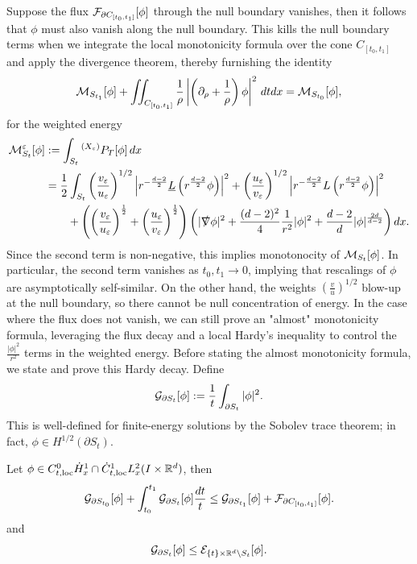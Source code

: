 Suppose the flux $\mathcal F_{\partial C_{[t_0, t_1]}}[\phi]$ through the null boundary vanishes, then it follows that $\phi$ must also vanish along the null boundary. This kills the null boundary terms when we integrate the local monotonicity formula over the cone $C_{[t_0, t_1]}$ and apply the divergence theorem, thereby furnishing the identity
	\[
			\mathcal M_{S_{t_1}} [\phi] + \iint_{C_{[t_0, t_1]}} \frac1\rho \left| \left( \partial_\rho + \frac1\rho \right) \phi\right|^2 \, dt dx = \mathcal M_{S_{t_0}} [\phi],
	\]
for the weighted energy
	\begin{align*}
		\mathcal M^\varepsilon_{S_t} [\phi] 
			&:= \int_{S_t} {^{(X_\varepsilon)}}P_T [\phi] \, dx \\
			&= \frac12 \int_{S_t} \left( \frac{v_\varepsilon}{u_\varepsilon} \right)^{1/2} \left| r^{-\frac{d - 2}{2}} \underline L \left( r^{\frac{d - 2}{2}} \phi \right)\right|^2 + \left( \frac{u_\varepsilon}{v_\varepsilon} \right)^{1/2} \left| r^{-\frac{d - 2}{2}} L \left( r^{\frac{d - 2}{2}} \phi \right)\right|^2 \\
			&\qquad + \left( \left( \frac{v_\varepsilon}{u_\varepsilon}\right)^\frac12  + \left( \frac{u_\varepsilon}{v_\varepsilon} \right)^\frac12 \right) \left(  |\slashed \nabla \phi|^2 + \frac{(d - 2)^2}{4} \frac1{r^2} |\phi|^2 + \frac{d - 2}{d} |\phi|^{\frac{2d}{d - 2}}  \right)	dx.
	\end{align*}
Since the second term is non-negative, this implies monotonocity of $\mathcal M_{S_{t}}[\phi]$. In particular, the second term vanishes as $t_0, t_1 \to 0$, implying that rescalings of $\phi$ are asymptotically self-similar. On the other hand, the weights $(\tfrac{v}{u})^{1/2}$ blow-up at the null boundary, so there cannot be null concentration of energy. In the case where the flux does not vanish, we can still prove an "almost" monotonicity formula, leveraging the flux decay and a local Hardy's inequality to control the $\tfrac{|\phi|^2}{r^2}$ terms in the weighted energy. Before stating the almost monotonicity formula, we state and prove this Hardy decay. Define 
	\[
		\mathcal G_{\partial S_t} [\phi]
			:= \frac1t \int_{\partial S_t} |\phi|^2.
	\]
This is well-defined for finite-energy solutions by the Sobolev trace theorem; in fact, $\phi \in H^{1/2}(\partial S_t)$.  

\begin{proposition}
	Let $\phi \in C^0_{t, \mathrm{loc}} \dot H^1_x \cap \dot C^1_{t, \mathrm{loc}} L^2_x (I \times \mathbb R^d)$, then
		\[
			\mathcal G_{\partial S_{t_0}} [\phi] + \int_{t_0}^{t_1} \mathcal G_{\partial S_t} [\phi] \frac{dt}{t} \leq \mathcal G_{\partial S_{t_1}} [\phi] + \mathcal F_{\partial C_{[t_0, t_1]}} [\phi].
		\]
	and 
		\[
			\mathcal G_{\partial S_t} [\phi] \leq \mathcal E_{\{t\} \times \mathbb R^d \setminus S_t} [\phi].
		\]		
\end{proposition}

